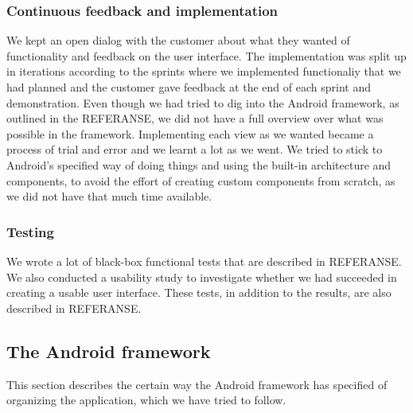 \subsubsection{Continuous feedback and implementation}
We kept an open dialog with the customer about what they wanted of functionality and feedback on the user interface. The implementation was split up in iterations according to the sprints where we implemented functionaliy that we had planned and the customer gave feedback at the end of each sprint and demonstration. 
\newline
\newline
Even though we had tried to dig into the Android framework, as outlined in the REFERANSE, we did not have a full overview over what was possible in the framework. Implementing each view as we wanted became a process of trial and error and we learnt a lot as we went. We tried to stick to Android's specified way of doing things and using the built-in architecture and components, to avoid the effort of creating custom components from scratch, as we did not have that much time available. 

\subsubsection{Testing}
We wrote a lot of black-box functional tests that are described in REFERANSE. We also conducted a usability study to investigate whether we had succeeded in creating a usable user interface. These tests, in addition to the results, are also described in REFERANSE.

\subsection{The Android framework}
This section describes the certain way the Android framework has specified of organizing the application, which we have tried to follow.

